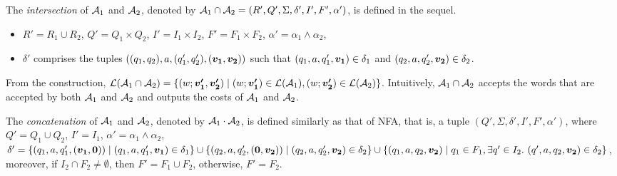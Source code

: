 The \emph{intersection} of $\mathcal{A}_1$ and $\mathcal{A}_2$, denoted by $\mathcal{A}_1 \cap \mathcal{A}_2 = (R', Q', \Sigma, \delta', I', F', \alpha')$, is defined in the sequel. 
\begin{itemize}
\item $R' = R_1 \cup R_2$, $Q' = Q_1 \times Q_2$, $I' = I_1 \times I_2$, $F' = F_1 \times F_2$, $\alpha' = \alpha_1 \wedge \alpha_2$, 
%
%
\item $\delta'$ comprises the tuples $((q_1, q_2), a, (q'_1, q'_2), (\myvec{v_1}, \myvec{v_2}))$ such that $(q_1,a, q'_1, \myvec{v_1}) \in \delta_1$ and $(q_2,a, q'_2, \myvec{v_2}) \in \delta_2$.
\end{itemize}
From the construction, $\Lang(\aut_1 \cap \aut_2) = \{(w; \myvec{v'_1}, \myvec{v'_2}) \mid (w; \myvec{v'_1}) \in \Lang(\aut_1), (w; \myvec{v'_2}) \in \Lang(\aut_2)\}$. 
Intuitively, $\mathcal{A}_1 \cap \mathcal{A}_2$ accepts the words that are accepted by both $\mathcal{A}_1$ and $\mathcal{A}_2$ and outputs the costs of $\mathcal{A}_1$ and $\mathcal{A}_2$.  


The \emph{concatenation} of $\mathcal{A}_1$ and $\mathcal{A}_2$, denoted by $\mathcal{A}_1 \cdot \mathcal{A}_2$, is defined similarly as that of NFA, that is, a tuple $(Q', \Sigma, \delta', I', F', \alpha')$, where $Q' = Q_1 \cup Q_2$, $I' = I_1$, $\alpha' = \alpha_1 \wedge \alpha_2$, $\delta' = \{(q_1, a, q'_1, (\myvec{v_1}, \myvec{0})) \mid (q_1, a, q'_1, \myvec{v_1}) \in \delta_1\} \cup \{(q_2, a, q'_2, (\myvec{0}, \myvec{v_2})) \mid (q_2, a, q'_2, \myvec{v_2}) \in \delta_2\} \cup \{(q_1, a, q_2, \vec{v_2}) \mid q_1 \in F_1, \exists q' \in I_2.\ (q', a, q_2, \vec{v_2}) \in \delta_2\}$, moreover, if $I_2 \cap F_2 \neq \emptyset$, then $F'= F_1 \cup F_2$, otherwise, $F'= F_2$.



